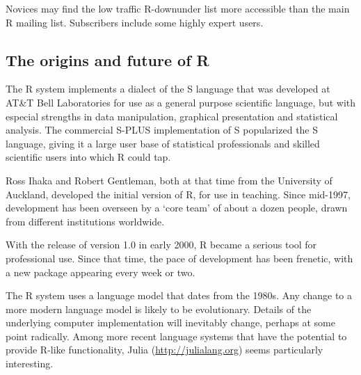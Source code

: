 Novices may find the low traffic R-downunder list more accessible
than the main R mailing list. Subscribers include some highly 
expert users.

\subsection*{The origins and future of R}

The R system implements a dialect of the S language 
that was developed at AT\&T Bell Laboratories for use as
a general purpose scientific language, but with especial strengths in
data manipulation, graphical presentation and statistical
analysis. The commercial S-PLUS implementation of S popularized the S
language, giving it a large user base of statistical professionals and
skilled scientific users into which R could tap.

Ross Ihaka and Robert Gentleman, both at that time from the University
of Auckland, developed the initial version of R, for use in teaching.
Since mid-1997, development has been overseen by a `core team'
of about a dozen people, drawn from different institutions worldwide.

With the release of version 1.0 in early 2000, R became a serious tool
for professional use.  Since that time, the pace of development has
been frenetic, with a new package appearing every week or two.

The R system uses a language model that dates from the
1980s.  Any change to a more modern language model is likely to be
evolutionary.  Details of the underlying computer implementation will
inevitably change, perhaps at some point radically. Among
more recent language systems   that have the potential to provide R-like functionality,
Julia (\url{http://julialang.org}) seems particularly interesting.

